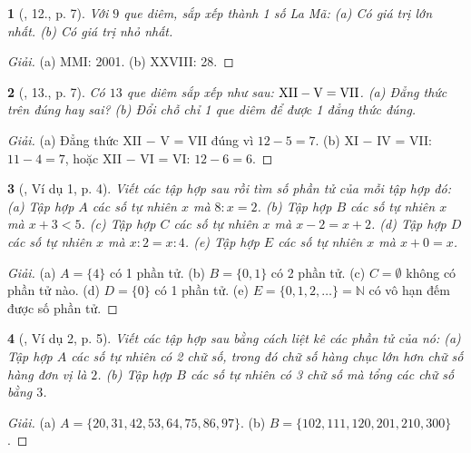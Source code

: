 \documentclass{article}
\newtheorem{baitoan}{}
\begin{document}
\begin{baitoan}[\cite{Tuyen_Toan_6}, 12., p. 7]
	Với $9$ que diêm, sắp xếp thành 1 số La Mã: (a) Có giá trị lớn nhất. (b) Có giá trị nhỏ nhất.
\end{baitoan}

\begin{proof}[Giải]
	(a) MMI: 2001. (b) XXVIII: 28.
\end{proof}

\begin{baitoan}[\cite{Tuyen_Toan_6}, 13., p. 7]
	Có $13$ que diêm sắp xếp như sau: $\rm XII - V = VII$. (a) Đẳng thức trên đúng hay sai? (b) Đổi chỗ chỉ 1 que diêm để được 1 đẳng thức đúng.
\end{baitoan}

\begin{proof}[Giải]
	(a) Đẳng thức XII $-$ V = VII đúng vì $12 - 5 = 7$. (b) XI $-$ IV = VII: $11 - 4 = 7$, hoặc XII $-$ VI = VI: $12 - 6 = 6$.
\end{proof}

\begin{baitoan}[\cite{Binh_Toan_6_tap_1}, Ví dụ 1, p. 4]
	Viết các tập hợp sau rồi tìm số phần tử của mỗi tập hợp đó: (a) Tập hợp $A$ các số tự nhiên $x$ mà $8:x = 2$. (b) Tập hợp $B$ các số tự nhiên $x$ mà $x + 3 < 5$. (c) Tập hợp $C$ các số tự nhiên $x$ mà $x - 2 = x + 2$. (d) Tập hợp $D$ các số tự nhiên $x$ mà $x:2 = x:4$. (e) Tập hợp $E$ các số tự nhiên $x$ mà $x + 0 = x$.
\end{baitoan}

\begin{proof}[Giải]
	(a) $A = \{4\}$ có 1 phần tử. (b) $B = \{0,1\}$ có 2 phần tử. (c) $C = \emptyset$ không có phần tử nào. (d) $D = \{0\}$ có 1 phần tử. (e) $E = \{0,1,2,\ldots\} = \mathbb{N}$ có vô hạn đếm được số phần tử.
\end{proof}

\begin{baitoan}[\cite{Binh_Toan_6_tap_1}, Ví dụ 2, p. 5]
	Viết các tập hợp sau bằng cách liệt kê các phần tử của nó: (a) Tập hợp $A$ các số tự nhiên có 2 chữ số, trong đó chữ số hàng chục lớn hơn chữ số hàng đơn vị là $2$. (b) Tập hợp $B$ các số tự nhiên có 3 chữ số mà tổng các chữ số bằng $3$.
\end{baitoan}

\begin{proof}[Giải]
	(a) $A = \{20,31,42,53,64,75,86,97\}$. (b) $B = \{102,111,120,201,210,300\}$.
\end{proof}
\end{document}

